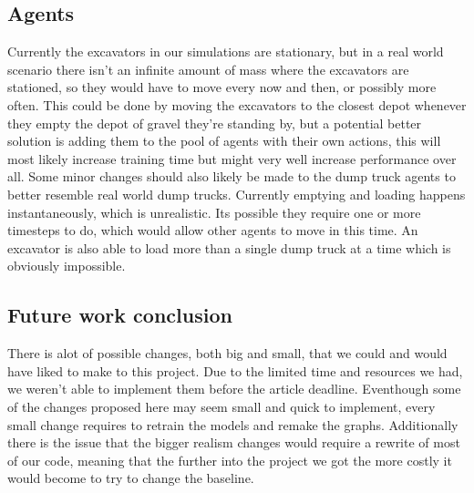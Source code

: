 \documentclass[conference]{IEEEtran}
\begin{document}

\subsection{Agents}
Currently the excavators in our simulations are stationary, but in a real world scenario there isn't an infinite amount of mass where the excavators are stationed, so they would have to move every now and then, or possibly more often.
This could be done by moving the excavators to the closest depot whenever they empty the depot of gravel they're standing by, but a potential better solution is adding them to the pool of agents with their own actions, this will most likely increase training time but might very well increase performance over all.
Some minor changes should also likely be made to the dump truck agents to better resemble real world dump trucks.
Currently emptying and loading happens instantaneously, which is unrealistic. Its possible they require one or more timesteps to do, which would allow other agents to move in this time.
An excavator is also able to load more than a single dump truck at a time which is obviously impossible.

\subsection{Future work conclusion}
There is alot of possible changes, both big and small, that we could and would have liked to make to this project.
Due to the limited time and resources we had, we weren't able to implement them before the article deadline.
Eventhough some of the changes proposed here may seem small and quick to implement, every small change requires to retrain the models and remake the graphs. Additionally there is the issue that the bigger realism changes would require a rewrite of most of our code, meaning that the further into the project we got the more costly it would become to try to change the baseline.



\end{document}
